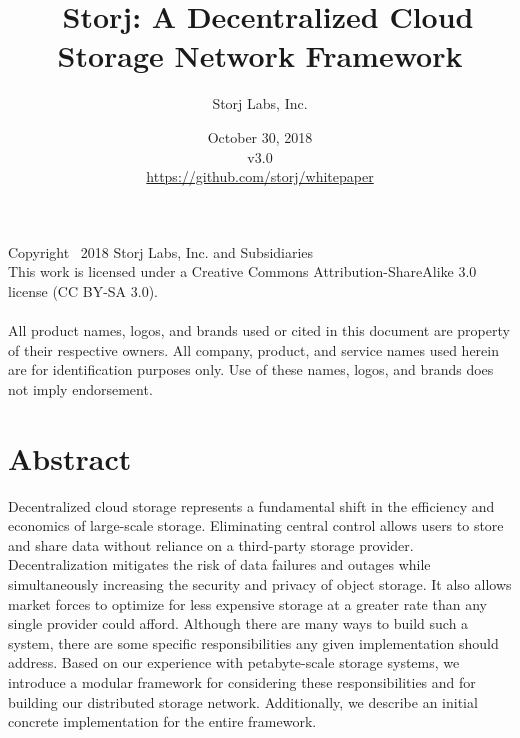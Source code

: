 \documentclass[8pt,fleqn,openany]{book}
\title{\textbf{\sffamily\color{white} \
Storj: A Decentralized Cloud Storage Network Framework}}
\author{\small\sffamily\color{white}
Storj Labs, Inc.}
\date{\small\sffamily\color{white} October 30, 2018\\v3.0\\
\small\colorlet{urllinkcolor}{white}\url{https://github.com/storj/whitepaper}
}
\begin{document}
\raggedbottom
{}

\thispagestyle{fancy}

\maketitle

\nobreakspace

\vfill{\footnotesize\noindent{}Copyright \textcopyright\ 2018 Storj Labs, Inc.
and Subsidiaries\\
This work is licensed under a Creative Commons Attribution-ShareAlike 3.0
license (CC BY-SA 3.0).\\\\
All product names, logos, and brands used or cited in this document are
property of their respective owners. All company, product, and service names
used herein are for identification purposes only. Use of these names, logos,
and brands does not imply endorsement.}

\newpage

\tableofcontents\newpage

\section{Abstract}

Decentralized cloud storage represents a fundamental shift in
the efficiency and economics of large-scale storage.
Eliminating central control allows users to store and share data
without reliance on a third-party storage provider. Decentralization mitigates
the risk of data failures and outages while simultaneously increasing
the security and privacy of object storage. It also
allows market forces to optimize for less expensive storage
at a greater rate than any single provider could afford.
Although there are many ways to build such a system, there are some specific
responsibilities any given implementation should address.
Based on our experience with petabyte-scale
storage systems, we introduce a modular framework for considering these
responsibilities and for building our distributed storage network.
Additionally, we describe an initial
concrete implementation for the entire framework.
\end{document}
